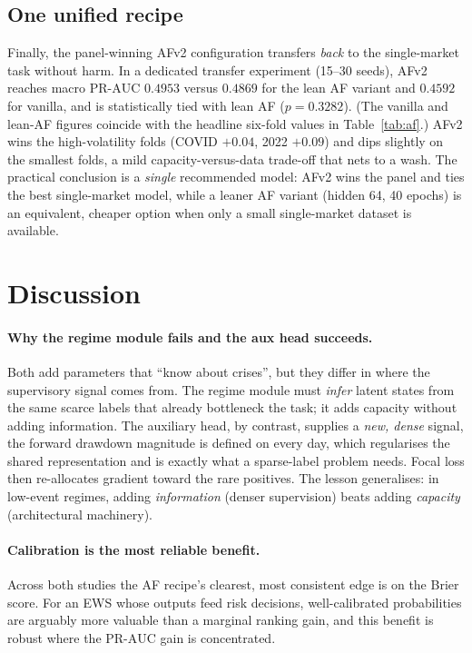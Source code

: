 \documentclass[11pt,a4paper]{article}
\newcommand{\prauc}{\mbox{PR-AUC}}
\begin{document}
\subsection{One unified recipe}
\label{sec:res-transfer}
Finally, the panel-winning AFv2 configuration transfers \emph{back} to the
single-market task without harm. In a dedicated transfer experiment (15--30
seeds), AFv2 reaches macro $\prauc$ $0.4953$ versus $0.4869$ for the lean AF
variant and $0.4592$ for vanilla, and is statistically tied with lean AF
($p=0.3282$). (The vanilla and
lean-AF figures coincide with the headline six-fold values in
Table~\ref{tab:af}.) AFv2 wins the
high-volatility folds (COVID $+0.04$, 2022 $+0.09$) and dips slightly on the
smallest folds, a mild capacity-versus-data trade-off that nets to a wash.
The practical conclusion is a \emph{single} recommended model: AFv2 wins the
panel and ties the best single-market model, while a leaner AF variant
(hidden 64, 40 epochs) is an equivalent, cheaper option when only a small
single-market dataset is available.

\section{Discussion}
\label{sec:discussion}

\paragraph{Why the regime module fails and the aux head succeeds.} Both add
parameters that ``know about crises'', but they differ in where the
supervisory signal comes from. The regime module must \emph{infer} latent
states from the same scarce labels that already bottleneck the task; it adds
capacity without adding information. The auxiliary head, by contrast, supplies
a \emph{new, dense} signal, the forward drawdown magnitude is defined on
every day, which regularises the shared representation and is exactly what a
sparse-label problem needs. Focal loss then re-allocates gradient toward the
rare positives. The lesson generalises: in low-event regimes, adding
\emph{information} (denser supervision) beats adding \emph{capacity}
(architectural machinery).

\paragraph{Calibration is the most reliable benefit.} Across both studies the
AF recipe's clearest, most consistent edge is on the Brier score. For an EWS
whose outputs feed risk decisions, well-calibrated probabilities are arguably
more valuable than a marginal ranking gain, and this benefit is robust where
the $\prauc$ gain is concentrated.
\end{document}
